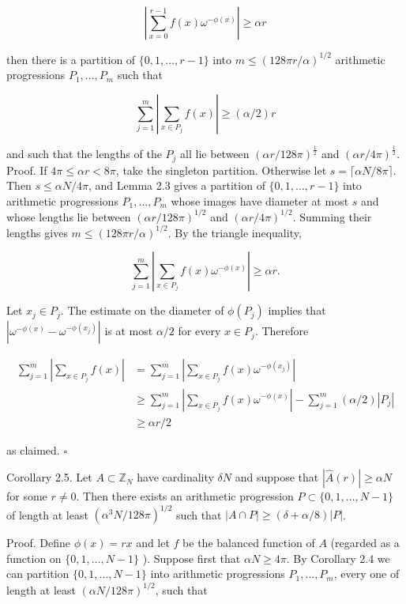 \documentclass[10pt]{article}
\begin{document}
$$
\left|\sum_{x=0}^{r-1} f(x) \omega^{-\phi(x)}\right| \geqslant \alpha r
$$

then there is a partition of $\{0,1, \ldots, r-1\}$ into $m \leqslant(128 \pi r / \alpha)^{1 / 2}$ arithmetic\\
progressions $P_{1}, \ldots, P_{m}$ such that

$$
\sum_{j=1}^{m}\left|\sum_{x \in P_{j}} f(x)\right| \geqslant(\alpha / 2) r
$$

and such that the lengths of the $P_{j}$ all lie between $(\alpha r / 128\pi)^{\frac{1}{2}}$ and $(\alpha r / 4\pi)^{\frac{1}{2}}$.\\
Proof. If $4\pi\leqslant\alpha r<8\pi$, take the singleton partition.  Otherwise let $s=\lceil\alpha N/8\pi\rceil$.  Then $s\leqslant\alpha N/4\pi$, and Lemma 2.3 gives a partition of $\{0,1, \ldots, r-1\}$ into arithmetic progressions $P_{1}, \ldots, P_{m}$ whose images have diameter at most $s$ and whose lengths lie between $(\alpha r/128\pi)^{1/2}$ and $(\alpha r/4\pi)^{1/2}$.  Summing their lengths gives $m\leqslant(128\pi r/\alpha)^{1/2}$. By the triangle inequality,

$$
\sum_{j=1}^{m}\left|\sum_{x \in P_{j}} f(x) \omega^{-\phi(x)}\right| \geqslant \alpha r .
$$

Let $x_{j} \in P_{j}$. The estimate on the diameter of $\phi\left(P_{j}\right)$ implies that $\left|\omega^{-\phi(x)}-\omega^{-\phi\left(x_{j}\right)}\right|$ is at most $\alpha / 2$ for every $x \in P_{j}$. Therefore

$$
\begin{aligned}
\sum_{j=1}^{m}\left|\sum_{x \in P_{j}} f(x)\right| & =\sum_{j=1}^{m}\left|\sum_{x \in P_{j}} f(x) \omega^{-\phi\left(x_{j}\right)}\right| \\
& \geqslant \sum_{j=1}^{m}\left|\sum_{x \in P_{j}} f(x) \omega^{-\phi(x)}\right|-\sum_{j=1}^{m}(\alpha / 2)\left|P_{j}\right| \\
& \geqslant \alpha r / 2
\end{aligned}
$$

as claimed. \(\square\)

Corollary 2.5. Let $A \subset \mathbb{Z}_{N}$ have cardinality $\delta N$ and suppose that $|\hat{A}(r)| \geqslant \alpha N$ for some $r \neq 0$. Then there exists an arithmetic progression $P \subset\{0,1, \ldots, N-1\}$ of length at least $\left(\alpha^{3} N / 128 \pi\right)^{1 / 2}$ such that $|A \cap P| \geqslant(\delta+\alpha / 8)|P|$.

Proof. Define $\phi(x)=r x$ and let $f$ be the balanced function of $A$ (regarded as a function on $\{0,1, \ldots, N-1\}$ ).  Suppose first that $\alpha N\geqslant4\pi$.  By Corollary 2.4 we can partition $\{0,1, \ldots, N-1\}$ into arithmetic progressions $P_{1}, \ldots, P_{m}$, every one of length at least $(\alpha N/128\pi)^{1/2}$, such that
\end{document}
